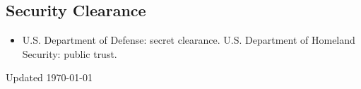 \documentclass{academiccv}
\begin{document}
\subsection*{Security Clearance}

\begin{itemize}
\item U.S. Department of Defense: secret clearance. U.S. Department of Homeland Security: public trust.
\end{itemize}


\begin{center}
\vspace{6em}
Updated \monthyeardate\today
\end{center} 
\end{document}

